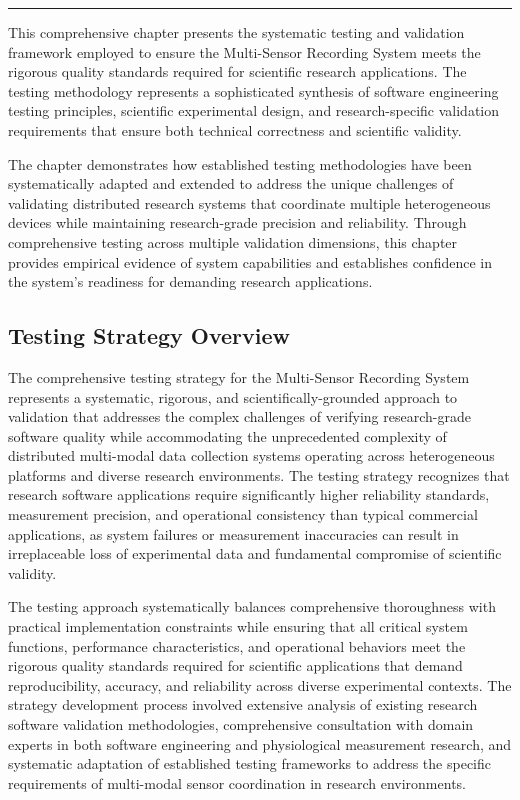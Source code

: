 \documentclass[12pt,a4paper]{article}
\begin{document}
\hrule

This comprehensive chapter presents the systematic testing and validation framework employed to ensure the Multi-Sensor
Recording System meets the rigorous quality standards required for scientific research applications. The testing
methodology represents a sophisticated synthesis of software engineering testing principles, scientific experimental
design, and research-specific validation requirements that ensure both technical correctness and scientific validity.

The chapter demonstrates how established testing methodologies have been systematically adapted and extended to address
the unique challenges of validating distributed research systems that coordinate multiple heterogeneous devices while
maintaining research-grade precision and reliability. Through comprehensive testing across multiple validation
dimensions, this chapter provides empirical evidence of system capabilities and establishes confidence in the system's
readiness for demanding research applications.

\subsection{Testing Strategy Overview}

The comprehensive testing strategy for the Multi-Sensor Recording System represents a systematic, rigorous, and
scientifically-grounded approach to validation that addresses the complex challenges of verifying research-grade
software quality while accommodating the unprecedented complexity of distributed multi-modal data collection systems
operating across heterogeneous platforms and diverse research environments. The testing strategy recognizes that
research software applications require significantly higher reliability standards, measurement precision, and
operational consistency than typical commercial applications, as system failures or measurement inaccuracies can result
in irreplaceable loss of experimental data and fundamental compromise of scientific validity.

The testing approach systematically balances comprehensive thoroughness with practical implementation constraints while
ensuring that all critical system functions, performance characteristics, and operational behaviors meet the rigorous
quality standards required for scientific applications that demand reproducibility, accuracy, and reliability across
diverse experimental contexts. The strategy development process involved extensive analysis of existing research
software validation methodologies, comprehensive consultation with domain experts in both software engineering and
physiological measurement research, and systematic adaptation of established testing frameworks to address the specific
requirements of multi-modal sensor coordination in research environments.
\end{document}
